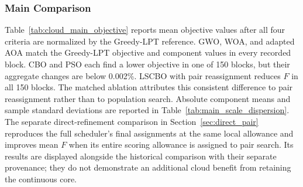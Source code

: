 \documentclass[pdflatex,onecolumn,sn-mathphys-num]{sn-jnl}
\begin{document}
\FloatBarrier

\subsubsection{Main Comparison}
Table~\ref{tab:cloud_main_objective} reports mean objective values after all four criteria are normalized by the Greedy-LPT reference. GWO, WOA, and adapted AOA match the Greedy-LPT objective and component values in every recorded block. CBO and PSO each find a lower objective in one of 150 blocks, but their aggregate changes are below 0.002\%. LSCBO with pair reassignment reduces $F$ in all 150 blocks. The matched ablation attributes this consistent difference to pair reassignment rather than to population search. Absolute component means and sample standard deviations are reported in Table~\ref{tab:main_scale_dispersion}. The separate direct-refinement comparison in Section~\ref{sec:direct_pair} reproduces the full scheduler's final assignments at the same local allowance and improves mean $F$ when its entire scoring allowance is assigned to pair search. Its results are displayed alongside the historical comparison with their separate provenance; they do not demonstrate an additional cloud benefit from retaining the continuous core.

\begin{table}[ht]
\centering
\caption{Mean normalized scalar objective $F$ over 30 paired seeds (lower is better). Direct-refinement rows come from the separate matched runs in Section~\ref{sec:direct_pair}; their labels give the local-trial allowances.}\label{tab:cloud_main_objective}
\end{table}
\end{document}
